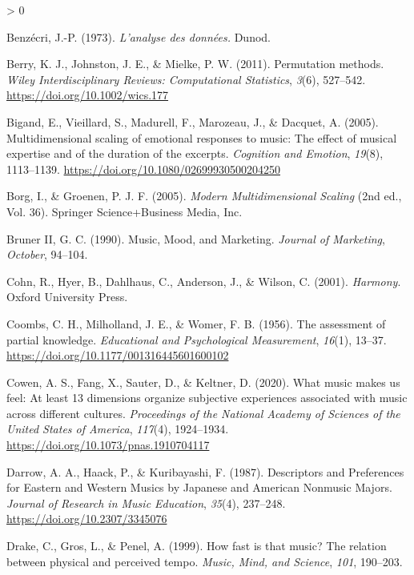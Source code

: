 \documentclass[
  english,
  man,floatsintext]{apa6}
\newlength{\cslhangindent}
\newenvironment{CSLReferences}[2] %
 {%
  \setlength{\parindent}{0pt}
  \ifodd #1 \everypar{\setlength{\hangindent}{\cslhangindent}}\ignorespaces\fi
  \ifnum #2 > 0
  \setlength{\parskip}{#2\baselineskip}
  \fi
 }%
 {}
\begin{document}
\begin{CSLReferences}{1}{0}
\leavevmode\hypertarget{ref-Benzecri1973}{}%
Benzécri, J.-P. (1973). \emph{{L'analyse des données.}} Dunod.

\leavevmode\hypertarget{ref-Berry2011}{}%
Berry, K. J., Johnston, J. E., \& Mielke, P. W. (2011). {Permutation methods}. \emph{Wiley Interdisciplinary Reviews: Computational Statistics}, \emph{3}(6), 527--542. \url{https://doi.org/10.1002/wics.177}

\leavevmode\hypertarget{ref-Bigand2005}{}%
Bigand, E., Vieillard, S., Madurell, F., Marozeau, J., \& Dacquet, A. (2005). {Multidimensional scaling of emotional responses to music: The effect of musical expertise and of the duration of the excerpts}. \emph{Cognition and Emotion}, \emph{19}(8), 1113--1139. \url{https://doi.org/10.1080/02699930500204250}

\leavevmode\hypertarget{ref-Borg2005}{}%
Borg, I., \& Groenen, P. J. F. (2005). \emph{{Modern Multidimensional Scaling}} (2nd ed., Vol. 36). Springer Science+Business Media, Inc.

\leavevmode\hypertarget{ref-BrunerII1990}{}%
Bruner II, G. C. (1990). {Music, Mood, and Marketing}. \emph{Journal of Marketing}, \emph{October}, 94--104.

\leavevmode\hypertarget{ref-Cohn2001}{}%
Cohn, R., Hyer, B., Dahlhaus, C., Anderson, J., \& Wilson, C. (2001). \emph{{Harmony}}. Oxford University Press.

\leavevmode\hypertarget{ref-Coombs1956}{}%
Coombs, C. H., Milholland, J. E., \& Womer, F. B. (1956). {The assessment of partial knowledge}. \emph{Educational and Psychological Measurement}, \emph{16}(1), 13--37. \url{https://doi.org/10.1177/001316445601600102}

\leavevmode\hypertarget{ref-Cowen2020}{}%
Cowen, A. S., Fang, X., Sauter, D., \& Keltner, D. (2020). {What music makes us feel: At least 13 dimensions organize subjective experiences associated with music across different cultures}. \emph{Proceedings of the National Academy of Sciences of the United States of America}, \emph{117}(4), 1924--1934. \url{https://doi.org/10.1073/pnas.1910704117}

\leavevmode\hypertarget{ref-Darrow1987}{}%
Darrow, A. A., Haack, P., \& Kuribayashi, F. (1987). {Descriptors and Preferences for Eastern and Western Musics by Japanese and American Nonmusic Majors}. \emph{Journal of Research in Music Education}, \emph{35}(4), 237--248. \url{https://doi.org/10.2307/3345076}

\leavevmode\hypertarget{ref-Drake1999}{}%
Drake, C., Gros, L., \& Penel, A. (1999). {How fast is that music? The relation between physical and perceived tempo.} \emph{Music, Mind, and Science}, \emph{101}, 190--203.


\end{CSLReferences}
\end{document}
